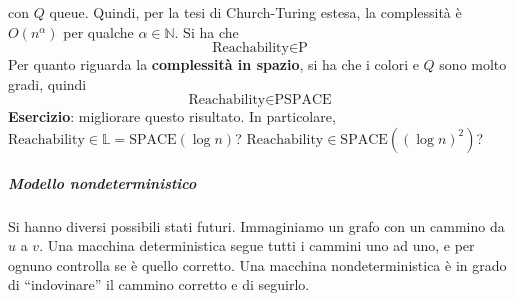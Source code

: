 con $Q$ queue. Quindi, per la tesi di Church-Turing estesa, la complessità è $O(n^\alpha)$ per qualche $\alpha\in\mathbb{N}$. Si ha che
$$
    \text{Reachability} \in \text{P}
$$
Per quanto riguarda la \textbf{complessità in spazio}, si ha che i colori e $Q$ sono molto gradi, quindi
$$
    \text{Reachability} \in \text{PSPACE}
$$
\textbf{Esercizio}: migliorare questo risultato. In particolare, $\text{Reachability} \in \mathbb{L} = \text{SPACE}(\log n)$? $\text{Reachability} \in \text{SPACE}((\log n)^2)$?
\subparagraph{Modello nondeterministico} Si hanno diversi possibili stati futuri. Immaginiamo un grafo con un cammino da $u$ a $v$. Una macchina deterministica segue tutti i cammini uno ad uno, e per ognuno controlla se è quello corretto. Una macchina nondeterministica è in grado di ``indovinare'' il cammino corretto e di seguirlo.

